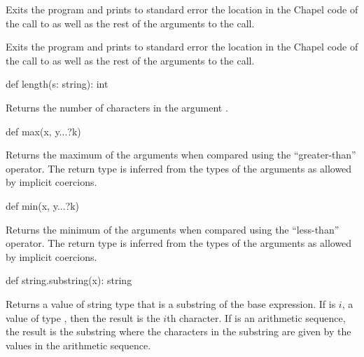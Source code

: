 \begin{protohead}
def halt() {
\end{protohead}
\begin{protobody}
Exits the program and prints to standard error the location in the
Chapel code of the call to  as well as the rest of the
arguments to the call.
\end{protobody}

\begin{protohead}
def halt(args ...?numArgs) {
\end{protohead}
\begin{protobody}
Exits the program and prints to standard error the location in the
Chapel code of the call to  as well as the rest of the
arguments to the call.
\end{protobody}

\begin{protohead}
def length(s: string): int
\end{protohead}
\begin{protobody}
Returns the number of characters in the argument .
\end{protobody}

\begin{protohead}
def max(x, y...?k)
\end{protohead}
\begin{protobody}
Returns the maximum of the arguments when compared using the
``greater-than'' operator.  The return type is inferred from the types
of the arguments as allowed by implicit coercions.
\end{protobody}

\begin{protohead}
def min(x, y...?k)
\end{protohead}
\begin{protobody}
Returns the minimum of the arguments when compared using the
``less-than'' operator.  The return type is inferred from the types of
the arguments as allowed by implicit coercions.
\end{protobody}

\begin{protohead}
def string.substring(x): string
\end{protohead}
\begin{protobody}
Returns a value of string type that is a substring of the base
expression.  If  is $i$, a value of type , then the
result is the $i$th character.  If  is an arithmetic sequence,
the result is the substring where the characters in the substring are
given by the values in the arithmetic sequence.
\end{protobody}

